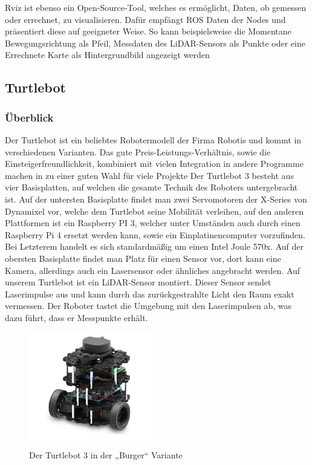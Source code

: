 {{{			Rviz ist ebenso ein Open-Source-Tool, welches es ermöglicht, Daten, ob gemessen oder errechnet, zu visualisieren. Dafür empfängt ROS Daten der Nodes und präsentiert diese auf geeigneter Weise. So kann beispielsweise die Momentane Bewegungsrichtung als Pfeil, Messdaten des LiDAR-Sensors als Punkte oder eine Errechnete Karte als Hintergrundbild angezeigt werden
			
			
		}
	}
	\subsection{Turtlebot}
	{
		\subsubsection{Überblick}
		{
			Der Turtlebot ist ein beliebtes Robotermodell der Firma Robotis und kommt in verschiedenen Varianten. Das gute Preis-Leistungs-Verhältnis, sowie die Einsteigerfreundlichkeit, kombiniert mit vielen Integration in andere Programme machen in zu einer guten Wahl für viele Projekte
			Der Turtlebot 3 besteht aus vier Basisplatten, auf welchen die gesamte Technik des Roboters untergebracht ist. Auf der untersten Basisplatte findet man zwei Servomotoren der X-Series von Dynamixel vor, welche dem Turtlebot seine Mobilität verleihen, auf den anderen Plattformen ist ein Raspberry PI 3, welcher unter Umständen auch durch einen Raspberry Pi 4 ersetzt werden kann, sowie ein Einplatinencomputer vorzufinden. Bei Letzterem handelt es sich standardmäßig um einen Intel Joule 570x. Auf der obersten Basisplatte findet man Platz für einen Sensor vor, dort kann eine Kamera, allerdings auch ein Lasersensor oder ähnliches angebracht werden. Auf unserem Turtlebot ist ein LiDAR-Sensor montiert. Dieser Sensor sendet Laserimpulse aus und kann durch das zurückgestrahlte Licht den Raum exakt vermessen. Der Roboter tastet die Umgebung mit den Laserimpulsen ab, was dazu führt, dass er Messpunkte erhält. 
			
			\begin{figure}[H]
				\centering
				\includegraphics[height=5cm]{Bilder/turtlebot_3_burger.png}
				\caption{Der Turtlebot 3 in der „Burger“ Variante \\ \parencite{turtlebot3burger001}} 
				\label{pic:turtle3burger}
			\end{figure}
			
}}}
